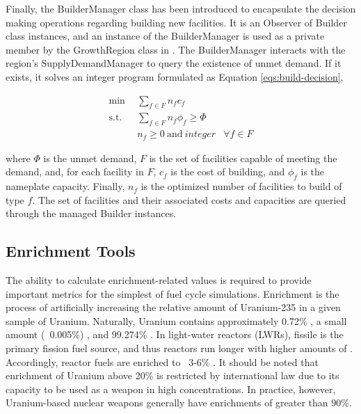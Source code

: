 Finally, the BuilderManager class has been introduced to encapsulate the
decision making operations regarding building new facilities. It is an Observer
of Builder class instances, and an instance of the BuilderManager is used as a
private member by the GrowthRegion class in \Cycamore. The BuilderManager
interacts with the region's SupplyDemandManager to query the existence of unmet
demand. If it exists, it solves an integer program formulated as Equation
\ref{eqs:build-decision},

\begin{subequations}\label{eqs:build-decision}
  \begin{align}
    \min \:\: & 
    \sum_{f \in F} n_f c_f
    & \\
    \text{s.t.} \:\: &
    \sum_{f \in F} n_f \phi_f \ge \Phi
    & \\
    &
    n_f \geq 0 \: \text{and} \: integer
    &
    \forall f \in F
  \end{align}
\end{subequations}
  
where $\Phi$ is the unmet demand, $F$ is the set of facilities capable of
meeting the demand, and, for each facility in $F$, $c_f$ is the cost of
building, and $\phi_f$ is the nameplate capacity.  Finally, $n_f$ is the
optimized number of facilities to build of type $f$. The set of facilities and
their associated costs and capacities are queried through the managed Builder
instances.

\subsection{Enrichment Tools}\label{sec:prev-enrich}

The ability to calculate enrichment-related values is required to provide
important metrics for the simplest of fuel cycle simulations. Enrichment is the
process of artificially increasing the relative amount of Uranium-235 in a given
sample of Uranium. Naturally, Uranium contains approximately 0.72\%
, a small amount (~0.005\%) , and 99.274\%
. In light-water reactors (LWRs), fissile  is the
primary fission fuel source, and thus reactors run longer with higher amounts of
. Accordingly, reactor fuels are enriched to ~3-6\%
. It should be noted that enrichment of Uranium above 20\% is
restricted by international law due to its capacity to be used as a weapon in
high concentrations. In practice, however, Uranium-based nuclear weapons
generally have enrichments of greater than 90\%.


